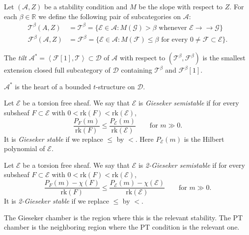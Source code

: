 \noindent
Let $(\mathcal{A},Z)$ be a stability
condition and $M$ be the slope with
respect to $Z$.
For each $\beta \in \mathbb{R}$
we define the following pair of
subcategories on $\mathcal{A}$:
$$
\begin{aligned}
\mathcal{T}^\beta(A,Z)&=\mathcal{T}^\beta
=\{\mathcal{E} \in \mathcal{A}
: M(\mathcal{G})>\beta
\text{ whenever }
\mathcal{E} \to\!\!\!\!\!\to
\mathcal{G}\}\\
\mathcal{F}^\beta(\mathcal{A},Z)
&=\mathcal{F}^\beta
=\{\mathcal{E} \in \mathcal{A}
:M(\mathcal{F})\leq \beta
\text{ for every }
0 \neq  \mathcal{F} \subset \mathcal{E}\}.
\end{aligned}
$$

\begin{definition}
\label{definition-tilt}
The {\it tilt}
$\mathcal{A}^*
=\left\langle{}\mathcal{F}[1],\mathcal{T}\right\rangle{}
\subset\mathcal{D}$
of $\mathcal{A}$ with respect to
$(\mathcal{T}^\beta,\mathcal{F}^\beta)$
is the smallest extension closed full
subcategory of $\mathcal{D}$ containing
$\mathcal{T}^\beta$ and
$\mathcal{F}^\beta[1]$.
\end{definition}

\noindent
$\mathcal{A}^*$ is the heart of a bounded
$t$-structure on $\mathcal{D}$.

\begin{definition}
\label{definition-gieseker-stability}
Let $\mathcal{E}$ be a torsion free
sheaf.
We say that $\mathcal{E}$ is
{\it Gieseker semistable} if
for every subsheaf $F \subset \mathcal{E}$
with $0 < \mathrm{rk}(F) <
\mathrm{rk}(\mathcal{E})$,
$$
\frac{P_F(m)}{\mathrm{rk}(F)}
\leq
\frac{P_{\mathcal{E}}(m)}{
\mathrm{rk}(\mathcal{E})}
\qquad \text{for } m \gg 0.
$$
It is {\it Gieseker stable}
if we replace $\leq$ by $<$.
Here $P_{\mathcal{E}}(m)$ is the
Hilbert polynomial of $\mathcal{E}$.
\end{definition}

\begin{definition}
\label{definition-2-gieseker-stability}
Let $\mathcal{E}$ be a torsion free
sheaf.
We say that $\mathcal{E}$ is
{\it 2-Gieseker semistable} if
for every subsheaf $F \subset \mathcal{E}$
with $0 < \mathrm{rk}(F) <
\mathrm{rk}(\mathcal{E})$,
$$
\frac{P_F(m)-\chi(F)}{\mathrm{rk}(F)}
\leq
\frac{P_{\mathcal{E}}(m)-\chi(\mathcal{E})}
{\mathrm{rk}(\mathcal{E})}
\qquad \text{for } m \gg 0.
$$
It is {\it 2-Gieseker stable}
if we replace $\leq$ by $<$.
\end{definition}

\noindent
The Gieseker chamber is the region
where this is the relevant stability.
The PT chamber is the neighboring region
where the PT condition is the relevant
one.


